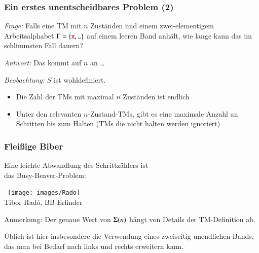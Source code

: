 \documentclass[onlymath]{beamer}
\begin{document}
\begin{frame}[t]\frametitle{Ein erstes unentscheidbares Problem (2)}

\emph{Frage:} Falls eine TM \alert{mit $n$ Zuständen} und \alert{einem zwei-elementigem Arbeitsalphabet $\Gamma=\{\Sterm{x}, \blank\}$} auf einem \alert{leeren Band} anhält, wie lange kann das im schlimmsten Fall dauern?\\
\bigskip\pause

\emph{Antwort:} Das kommt auf $n$ an \ldots\bigskip\pause


\emph{Beobachtung:} $S$ ist wohldefiniert.
\begin{itemize}
\item Die Zahl der TMs mit maximal $n$ Zuständen ist endlich
\item Unter den relevanten $n$-Zustand-TMs, gibt es eine maximale Anzahl an Schritten bis zum Halten (TMs die nicht halten werden ignoriert)
\end{itemize}

\end{frame}

\begin{frame}\frametitle{Fleißige Biber}\label{frame_rado}

\begin{minipage}[b]{7.5cm}
Eine leichte Abwandlung des Schrittzählers ist\\das Busy-Beaver-Problem:
\end{minipage}%
\begin{minipage}[t]{2.5cm}
~\hspace{2mm}\texttt{[image: images/Rado]}\\
{\tiny \mbox{}\hspace{2mm}Tibor Rad\'{o}, BB-Erfinder}
\end{minipage}\bigskip



Anmerkung: Der genaue Wert von $\boldsymbol{\Sigma}(n)$ hängt von Details der TM-Definition ab.\\[0.5ex]
{\footnotesize Üblich ist hier insbesondere die Verwendung eines zweiseitig unendlichen Bands, das man bei Bedarf nach links und rechts erweitern kann.

}

\end{frame}
\end{document}
